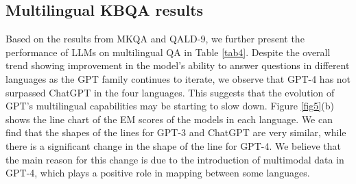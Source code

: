 \documentclass[runningheads]{llncs}
\begin{document}
\begin{table}[t] \centering
\caption{Comparison of LLMs on multilingual test sets.}\label{tab4}
\end{table}

\subsection{Multilingual KBQA results}
Based on the results from MKQA and QALD-9, we further present the performance of LLMs on multilingual QA in Table \ref{tab4}. Despite the overall trend showing improvement in the model's ability to answer questions in different languages as the GPT family continues to iterate, we observe that GPT-4 has not surpassed ChatGPT in the four languages. This suggests that the evolution of GPT's multilingual capabilities may be starting to slow down.
Figure \ref{fig5}(b) shows the line chart of the EM scores of the models in each language. We can find that the shapes of the lines for GPT-3 and ChatGPT are very similar, while there is a significant change in the shape of the line for GPT-4. We believe that the main reason for this change is due to the introduction of multimodal data in GPT-4, which plays a positive role in mapping between some languages.
\end{document}
